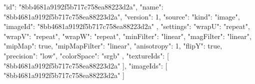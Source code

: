 {
  "id": "8bb4681a9192f5b717c758ea88223d2a",
  "name": "8bb4681a9192f5b717c758ea88223d2a",
  "version": 1,
  "source": {
    "kind": "image",
    "imageId": "8bb4681a9192f5b717c758ea88223d2a"
  },
  "settings": {
    "wrapU": "repeat",
    "wrapV": "repeat",
    "wrapW": "repeat",
    "minFilter": "linear",
    "magFilter": "linear",
    "mipMap": true,
    "mipMapFilter": "linear",
    "anisotropy": 1,
    "flipY": true,
    "precision": "low",
    "colorSpace": "srgb"
  },
  "textureIds": [
    "8bb4681a9192f5b717c758ea88223d2a"
  ],
  "imageIds": [
    "8bb4681a9192f5b717c758ea88223d2a"
  ]
}
